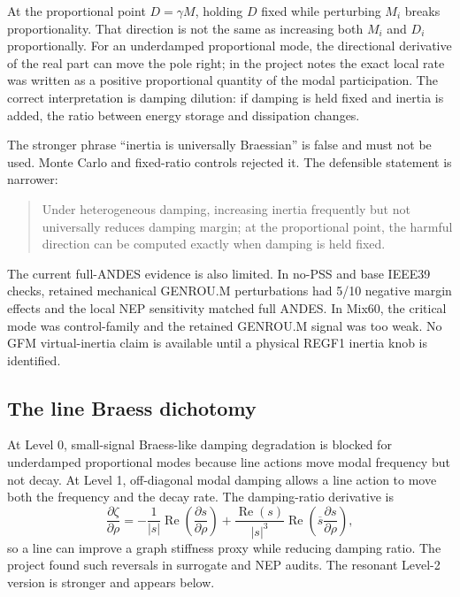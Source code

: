\documentclass[11pt]{article}
\newcommand{\Real}{\operatorname{Re}}
\begin{document}
At the proportional point $D=\gamma M$, holding $D$ fixed while perturbing $M_i$
breaks proportionality. That direction is not the same as increasing both
$M_i$ and $D_i$ proportionally. For an underdamped proportional mode, the
directional derivative of the real part can move the pole right; in the
project notes the exact local rate was written as a positive proportional
quantity of the modal participation. The correct interpretation is damping
dilution: if damping is held fixed and inertia is added, the ratio between
energy storage and dissipation changes.

The stronger phrase ``inertia is universally Braessian'' is false and must not
be used. Monte Carlo and fixed-ratio controls rejected it. The defensible
statement is narrower:

\begin{quote}
Under heterogeneous damping, increasing inertia frequently but not universally
reduces damping margin; at the proportional point, the harmful direction can be
computed exactly when damping is held fixed.
\end{quote}

The current full-ANDES evidence is also limited. In no-PSS and base IEEE39
checks, retained mechanical GENROU.M perturbations had 5/10 negative margin
effects and the local NEP sensitivity matched full ANDES. In Mix60, the
critical mode was control-family and the retained GENROU.M signal was too weak.
No GFM virtual-inertia claim is available until a physical REGF1 inertia knob
is identified.

\subsection{The line Braess dichotomy}

At Level 0, small-signal Braess-like damping degradation is blocked for
underdamped proportional modes because line actions move modal frequency but
not decay. At Level 1, off-diagonal modal damping allows a line action to move
both the frequency and the decay rate. The damping-ratio derivative is
\begin{equation}
  \frac{\partial \zeta}{\partial \rho}
  = -\frac{1}{|s|}\Real\!\left(\frac{\partial s}{\partial \rho}\right)
    +\frac{\Real(s)}{|s|^3}
      \Real\!\left(\overline{s}\frac{\partial s}{\partial \rho}\right),
  \label{eq:zeta-derivative}
\end{equation}
so a line can improve a graph stiffness proxy while reducing damping ratio.
The project found such reversals in surrogate and NEP audits. The resonant
Level-2 version is stronger and appears below.
\end{document}
